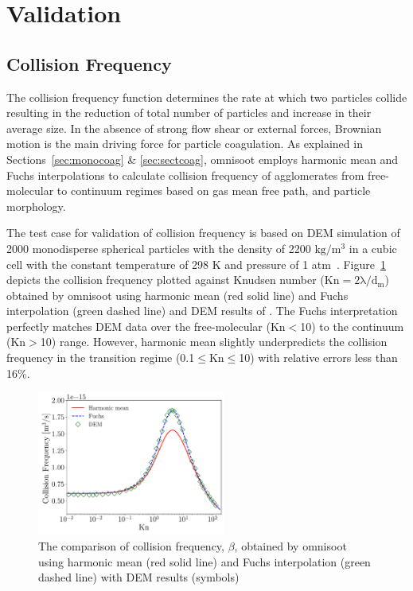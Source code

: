 \section{Validation}

\subsection{Collision Frequency}
The collision frequency function determines the rate at which two particles collide resulting in the reduction of total number of particles and increase in their average size. In the absence of strong flow shear or external forces, Brownian motion is the main driving force for particle coagulation. As explained in Sections~\ref{sec:monocoag} \& \ref{sec:sectcoag}, omnisoot employs harmonic mean and Fuchs interpolations to calculate collision frequency of agglomerates from free-molecular to continuum regimes based on gas mean free path, and particle morphology. 

The test case for validation of collision frequency is based on DEM simulation of 2000 monodisperse spherical particles with the density of 2200 $\mathrm{kg/m^3}$ in
a cubic cell with the constant temperature of 298 K and pressure of 1 atm~\citep{goudeli2015coagulation}. Figure~\ref{fig:kernelvalid} depicts the collision frequency plotted against Knudsen number ($\mathrm{Kn=2\lambda/d_m}$) obtained by omnisoot using harmonic mean (red solid line) and Fuchs interpolation (green dashed line) and DEM results of \citet{goudeli2015coagulation}. The Fuchs interpretation perfectly matches DEM data over the free-molecular (Kn$<$10) to the continuum (Kn$>$10) range. However, harmonic mean slightly underpredicts the collision frequency in the transition regime (0.1$\le$Kn$\le$10) with relative errors less than 16\%. 
\begin{figure}[!htbp]
	\centering
	\includegraphics[width=0.55\textwidth]{Figures/Results/Validation/Kernel/kernel_valid.pdf}
	\caption{The comparison of collision frequency, $\beta$, obtained by omnisoot using harmonic mean (red solid line) and Fuchs interpolation (green dashed line) with DEM results (symbols)~\citep{goudeli2015coagulation}}
	\label{fig:kernelvalid}
\end{figure} 


